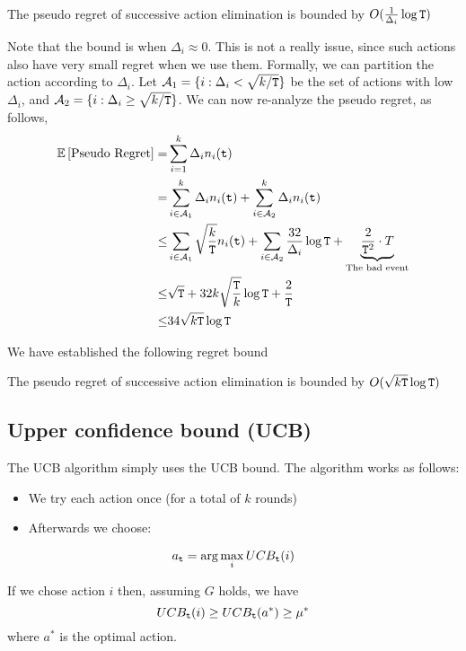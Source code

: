 \begin{theorem}
\label{thm:MAB:SE1}
The pseudo regret of successive action elimination is bounded by $O(\frac{1}{\Delta_{i}}\log {\tt T})$
\end{theorem}

Note that the bound is  when $\Delta_i\approx 0$. This is not a really issue, since such actions also have very small regret when we use them. Formally, we can partition the action according to $\Delta_i$. Let $\mathcal{A}_1=\{i:\Delta_i< \sqrt{k/{\tt T}}\}$ be the set of actions with low $\Delta_i$, and $\mathcal{A}_2=\{i:\Delta_i\geq \sqrt{k/{\tt T}}\}$. We can now re-analyze the pseudo regret, as follows,
\begin{align*}
\mathbb{E}\left[\text{Pseudo Regret}\right]  = &  \sum_{i=1}^{k}\Delta_{i}n_{i}({\tt t})\\
= &  \sum_{i\in \mathcal{A}_1}^{k}\Delta_{i}n_{i}({\tt t})+ \sum_{i\in \mathcal{A}_2}^{k}\Delta_{i}n_{i}({\tt t})\\
  \le & \sum_{i\in\mathcal{A}_1}\sqrt{\frac{k}{{\tt T}}}n_{i}({\tt t}) +\sum_{i\in\mathcal{A}_2}\frac{32}{\Delta_{i}}\log {\tt T}
  +\underbrace{\frac{2}{{\tt T}^{2}}\cdot T}_{\text{The bad event}}\\
  \leq & \sqrt{{\tt T}}+ 32 k \sqrt{\frac{{\tt T}}{k}}\log{\tt T}+ \frac{2}{{\tt T}}\\
  \leq & 34  \sqrt{k{\tt T}}\log{\tt T}
\end{align*}

We have established the following regret bound

\begin{theorem}
\label{thm:MAB:SE2}
The pseudo regret of successive action elimination is bounded by $O( \sqrt{k{\tt T}}\log{\tt T})$
\end{theorem}


\subsection{Upper confidence bound (UCB)}

The UCB algorithm simply uses the UCB bound. The algorithm works as
follows:
\begin{itemize}
\item We try each action once (for a total of $k$ rounds)
\item Afterwards we choose:
\end{itemize}
\[
a_{{\tt t}}=\arg\max_{i}UCB_{{\tt t}}(i)
\]

If we chose action $i$ then, assuming $G$ holds, we have
\[
UCB_{{\tt t}}(i)  \ge  UCB_{{\tt t}}(a^*)\geq\mu^{*}
\]
where $a^*$ is the optimal action.

